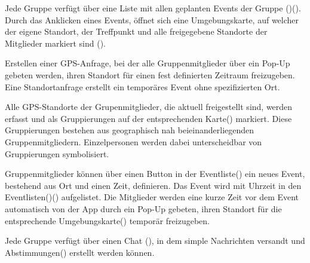 \documentclass[parskip=full,11pt]{scrartcl}
\begin{document}
Jede Gruppe verfügt über eine Liste mit allen geplanten Events der Gruppe
()().
Durch das Anklicken eines Events, öffnet sich eine Umgebungskarte, auf welcher der eigene Standort,
der Treffpunkt und alle freigegebene Standorte der Mitglieder markiert sind ().

Erstellen einer GPS-Anfrage, bei der alle Gruppenmitglieder über ein Pop-Up gebeten werden, ihren Standort
für einen fest definierten Zeitraum freizugeben. Eine Standortanfrage erstellt ein temporäres Event ohne
spezifizierten Ort.

Alle GPS-Standorte der Grupenmitglieder, die aktuell freigestellt sind, werden erfasst und als Gruppierungen
auf der entsprechenden Karte() markiert. Diese Gruppierungen bestehen
aus geographisch nah beieinanderliegenden Gruppenmitgliedern. Einzelpersonen werden dabei unterscheidbar
von Gruppierungen symbolisiert.

Gruppenmitglieder können über einen Button in der Eventliste() ein neues Event,
bestehend aus Ort und einen Zeit, definieren. Das Event wird mit Uhrzeit in den
Eventlisten()() aufgelistet.
Die Mitglieder werden eine kurze Zeit vor dem Event automatisch von der App durch ein Pop-Up gebeten,
ihren Standort für die entsprechende Umgebungskarte() temporär freizugeben.

Jede Gruppe verfügt über einen Chat (), in dem simple Nachrichten versandt
und Abstimmungen() erstellt werden können.
\end{document}

